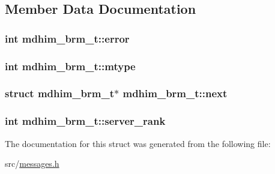 \subsection{Member Data Documentation}
\hypertarget{structmdhim__brm__t_ae52738aa96be251a3565ba89b11364f4}{
\subsubsection[{error}]{\setlength{\rightskip}{0pt plus 5cm}int mdhim\-\_\-brm\-\_\-t\-::error}}\label{de/d70/structmdhim__brm__t_ae52738aa96be251a3565ba89b11364f4}
\hypertarget{structmdhim__brm__t_abec78e9a1df09e0c2895c51edcacf59e}{
\subsubsection[{mtype}]{\setlength{\rightskip}{0pt plus 5cm}int mdhim\-\_\-brm\-\_\-t\-::mtype}}\label{de/d70/structmdhim__brm__t_abec78e9a1df09e0c2895c51edcacf59e}
\hypertarget{structmdhim__brm__t_ae3a86c1cd3f91266fccf3a90dd5798d5}{
\subsubsection[{next}]{\setlength{\rightskip}{0pt plus 5cm}struct {\bf mdhim\-\_\-brm\-\_\-t}$\ast$ mdhim\-\_\-brm\-\_\-t\-::next}}\label{de/d70/structmdhim__brm__t_ae3a86c1cd3f91266fccf3a90dd5798d5}
\hypertarget{structmdhim__brm__t_a909ab473a5cde03aac89c5ef6aabc7cd}{
\subsubsection[{server\-\_\-rank}]{\setlength{\rightskip}{0pt plus 5cm}int mdhim\-\_\-brm\-\_\-t\-::server\-\_\-rank}}\label{de/d70/structmdhim__brm__t_a909ab473a5cde03aac89c5ef6aabc7cd}


The documentation for this struct was generated from the following file\-:\begin{DoxyCompactItemize}
\item 
src/\hyperlink{messages_8h}{messages.\-h}\end{DoxyCompactItemize}

